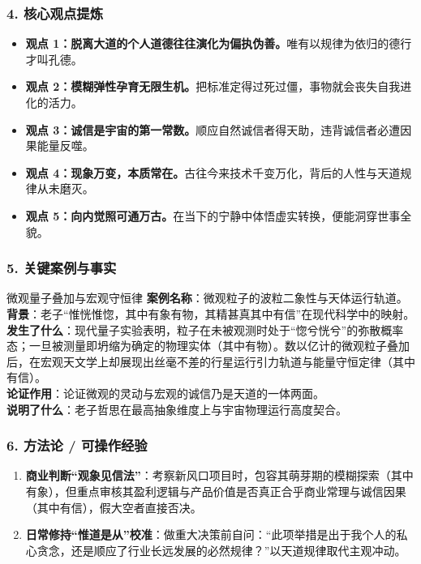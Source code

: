 \subsubsection{4. 核心观点提炼}
\begin{itemize}
    \item \textbf{观点 1：脱离大道的个人道德往往演化为偏执伪善。}唯有以规律为依归的德行才叫孔德。
    \item \textbf{观点 2：模糊弹性孕育无限生机。}把标准定得过死过僵，事物就会丧失自我进化的活力。
    \item \textbf{观点 3：诚信是宇宙的第一常数。}顺应自然诚信者得天助，违背诚信者必遭因果能量反噬。
    \item \textbf{观点 4：现象万变，本质常在。}古往今来技术千变万化，背后的人性与天道规律从未磨灭。
    \item \textbf{观点 5：向内觉照可通万古。}在当下的宁静中体悟虚实转换，便能洞穿世事全貌。
\end{itemize}

\subsubsection{5. 关键案例与事实}
\begin{CaseBox}{微观量子叠加与宏观守恒律}
\textbf{案例名称}：微观粒子的波粒二象性与天体运行轨道。\\
\textbf{背景}：老子“惟恍惟惚，其中有象有物，其精甚真其中有信”在现代科学中的映射。\\
\textbf{发生了什么}：现代量子实验表明，粒子在未被观测时处于“惚兮恍兮”的弥散概率态；一旦被测量即坍缩为确定的物理实体（其中有物）。数以亿计的微观粒子叠加后，在宏观天文学上却展现出丝毫不差的行星运行引力轨道与能量守恒定律（其中有信）。\\
\textbf{论证作用}：论证微观的灵动与宏观的诚信乃是天道的一体两面。\\
\textbf{说明了什么}：老子哲思在最高抽象维度上与宇宙物理运行高度契合。
\end{CaseBox}

\subsubsection{6. 方法论 / 可操作经验}
\begin{enumerate}
    \item \textbf{商业判断“观象见信法”}：考察新风口项目时，包容其萌芽期的模糊探索（其中有象），但重点审核其盈利逻辑与产品价值是否真正合乎商业常理与诚信因果（其中有信），假大空者直接否决。
    \item \textbf{日常修持“惟道是从”校准}：做重大决策前自问：“此项举措是出于我个人的私心贪念，还是顺应了行业长远发展的必然规律？”以天道规律取代主观冲动。
\end{enumerate}

